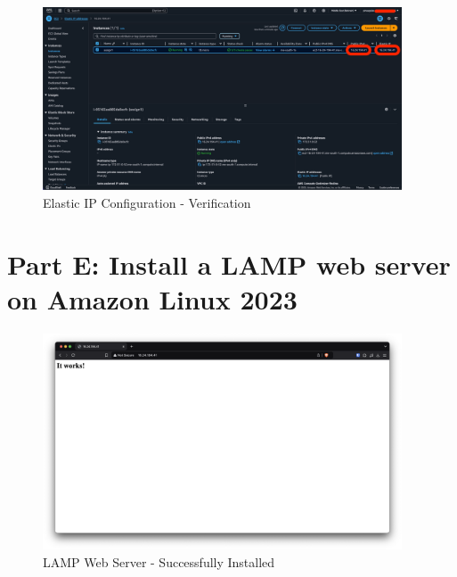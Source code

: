 \documentclass[a4paper,12pt]{article}
\begin{document}
\begin{figure}[H]
    \centering
    \includegraphics[width=0.95\textwidth]{elastic-ip-3.png}
    \caption{Elastic IP Configuration - Verification}
    \label{fig:elastic3}
\end{figure}

\newpage

\section{Part E: Install a LAMP web server on Amazon Linux 2023}

\begin{figure}[H]
    \centering
    \includegraphics[width=0.95\textwidth]{lamp-server-1.png}
    \caption{LAMP Web Server - Successfully Installed}
    \label{fig:lamp1}
\end{figure}
\end{document}
